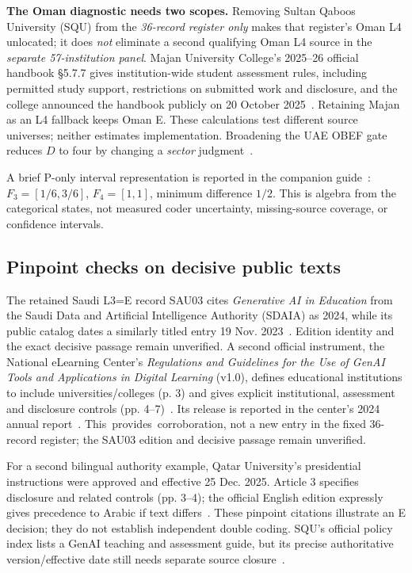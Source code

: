 \documentclass[conference,letterpaper]{IEEEtran}
\begin{document}
\textbf{The Oman diagnostic needs two scopes.} Removing Sultan Qaboos University (SQU) from the \emph{36-record register only} makes that register's Oman L4 unlocated; it does \emph{not} eliminate a second qualifying Oman L4 source in the \emph{separate 57-institution panel}. Majan University College's 2025--26 official handbook \S5.7.7 gives institution-wide student assessment rules, including permitted study support, restrictions on submitted work and disclosure, and the college announced the handbook publicly on 20 October 2025~\cite{majanhb,majannews}. Retaining Majan as an L4 fallback keeps Oman E. These calculations test different source universes; neither estimates implementation. Broadening the UAE OBEF gate reduces $D$ to four by changing a \emph{sector} judgment~\cite{obef}.

A brief P-only interval representation is reported in the companion guide~\cite{petry,pekala}: $F_3=[1/6,3/6]$, $F_4=[1,1]$, minimum difference $1/2$. This is algebra from the categorical states, not measured coder uncertainty, missing-source coverage, or confidence intervals.

\subsection{Pinpoint checks on decisive public texts}
The retained Saudi L3=E record SAU03 cites \emph{Generative AI in Education} from the Saudi Data and Artificial Intelligence Authority (SDAIA) as 2024, while its public catalog dates a similarly titled entry 19 Nov. 2023~\cite{sdaiacat}. Edition identity and the exact decisive passage remain unverified. A second official instrument, the National eLearning Center's \emph{Regulations and Guidelines for the Use of GenAI Tools and Applications in Digital Learning} (v1.0), defines educational institutions to include universities/colleges (p. 3) and gives explicit institutional, assessment and disclosure controls (pp. 4--7)~\cite{nelcguide}. Its release is reported in the center's 2024 annual report~\cite{nelcreport}. This~provides~corroboration, not a new entry in the fixed 36-record register; the SAU03 edition and decisive passage remain unverified.

For a second bilingual authority example, Qatar University's presidential instructions were approved and effective 25 Dec. 2025. Article 3 specifies disclosure and related controls (pp. 3--4); the official English edition expressly gives precedence to Arabic if text differs~\cite{qataru}. These pinpoint citations illustrate an E decision; they do not establish independent double coding. SQU's official policy index lists a GenAI teaching and assessment guide, but its precise authoritative version/effective date still needs separate source closure~\cite{squ}.
\end{document}
